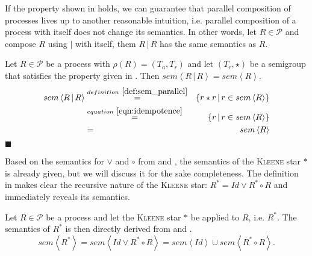 \begin{theorem}
If the property shown in  holds, we can guarantee that parallel composition of processes lives up to another reasonable intuition, i.e. parallel composition of a process with itself does not change its semantics. In other words, let $R \in \mathcal{P}$ and compose $R$ using $|$ with itself, them $R \,|\, R$ has the same semantics as $R$.
\end{theorem}

\begin{myproof}
Let $R \in \mathcal{P}$ be a process with $\rho \left( R \right) = \left( T_a, T_r \right)$ and let $\left( T_r, \star \right)$ be a semigroup that satisfies the property given in . Then $sem \left\langle R \,|\, R \right\rangle = sem \left\langle R \right\rangle$.
  \begin{eqnarray*}
    sem \left\langle R \,|\, R \right\rangle & \overset{\defref{def:sem_parallel}}{=} & \left\{ r \star r \,|\, r \in sem \left\langle R \right\rangle \right\} \\
    & \overset{\eqnref{eqn:idempotence}}{=} & \left\{ r \,|\, r \in sem \left\langle R \right\rangle \right\} \\
    & = & sem \left\langle R \right\rangle 
  \end{eqnarray*}
  \hfill$\blacksquare$
\end{myproof}




Based on the semantics for $\vee$ and $\circ$ from  and , the semantics of the \textsc{Kleene} star $*$ is already given, but we will discuss it for the sake completeness. The definition in  makes clear the recursive nature of the \textsc{Kleene} star: $R^* = Id \vee R^* \circ R$ and immediately reveals its semantics.
\begin{definition}
\label{def:sem_kleene}
Let $R \in \mathcal{P}$ be a process and let the \textsc{Kleene} star $*$ be applied to $R$, i.e. $R^*$. The semantics of $R^*$ is then directly derived from  and .
  \begin{equation}
    \label{eqn:sem_kleene}
    sem \left\langle R^* \right\rangle = sem \left\langle Id \vee R^* \circ R \right\rangle = sem \left\langle Id \right\rangle \cup sem \left\langle R^* \circ R \right\rangle.
  \end{equation}
  \hfill\qedsymbol
\end{definition}

